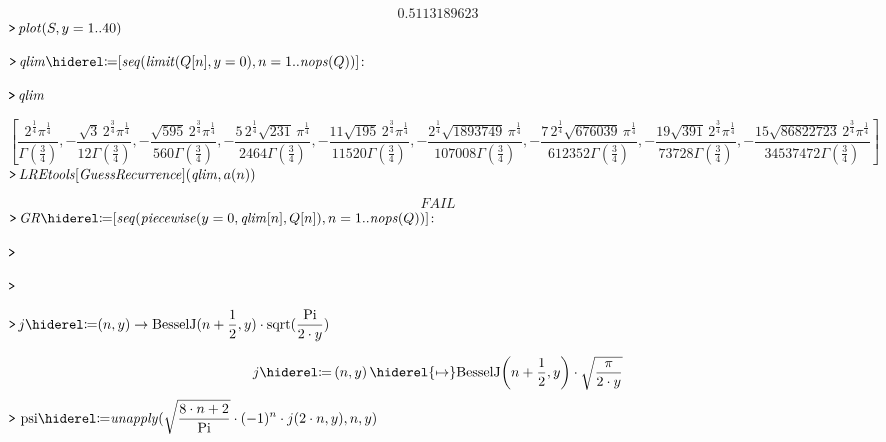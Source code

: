 \documentclass{article}
\begin{document}
\begin{dmath}\label{(37)}
 0.5113189623
\end{dmath}
\mapleinput
{$ \displaystyle \texttt{>\,} \mathit{plot} (S ,y =1..40) $}


\mapleinput
{$ \displaystyle \texttt{>\,} \mathit{qlim} \coloneqq [\mathit{seq} (\mathit{limit} (Q [n],y =0),n =1..\mathit{nops} (Q))]\colon  $}

\mapleinput
{$ \displaystyle \texttt{>\,} \mathit{qlim}  $}

\begin{dmath}\label{(38)}
\left[\frac{2^{\frac{1}{4}} \pi^{\frac{1}{4}}}{\Gamma \! \left(\frac{3}{4}\right)},-\frac{\sqrt{3}\, 2^{\frac{3}{4}} \pi^{\frac{1}{4}}}{12 \Gamma \! \left(\frac{3}{4}\right)},-\frac{\sqrt{595}\, 2^{\frac{3}{4}} \pi^{\frac{1}{4}}}{560 \Gamma \! \left(\frac{3}{4}\right)},-\frac{5 \,2^{\frac{1}{4}} \sqrt{231}\, \pi^{\frac{1}{4}}}{2464 \Gamma \! \left(\frac{3}{4}\right)},-\frac{11 \sqrt{195}\, 2^{\frac{3}{4}} \pi^{\frac{1}{4}}}{11520 \Gamma \! \left(\frac{3}{4}\right)},-\frac{2^{\frac{1}{4}} \sqrt{1893749}\, \pi^{\frac{1}{4}}}{107008 \Gamma \! \left(\frac{3}{4}\right)},-\frac{7 \,2^{\frac{1}{4}} \sqrt{676039}\, \pi^{\frac{1}{4}}}{612352 \Gamma \! \left(\frac{3}{4}\right)},-\frac{19 \sqrt{391}\, 2^{\frac{3}{4}} \pi^{\frac{1}{4}}}{73728 \Gamma \! \left(\frac{3}{4}\right)},-\frac{15 \sqrt{86822723}\, 2^{\frac{3}{4}} \pi^{\frac{1}{4}}}{34537472 \Gamma \! \left(\frac{3}{4}\right)}\right]
\end{dmath}
\mapleinput
{$ \displaystyle \texttt{>\,} \mathit{LREtools} [\mathit{GuessRecurrence}](\mathit{qlim} ,a (n)) $}

\begin{dmath}\label{(39)}
\mathit{FAIL} 
\end{dmath}
\mapleinput
{$ \displaystyle \texttt{>\,} \mathit{GR} \coloneqq [\mathit{seq} (\mathit{piecewise} (y =0,\mathit{qlim} [n],Q [n]),n =1..\mathit{nops} (Q))]\colon  $}

\mapleinput
{$ \displaystyle \texttt{>\,}  $}

\mapleinput
{$ \displaystyle \texttt{>\,}  $}

\mapleinput
{$ \displaystyle \texttt{>\,} j \coloneqq (n ,y)\rightarrow \mathrm{BesselJ}(n +\frac{1}{2},y)\cdot \mathrm{sqrt}(\frac{\mathrm{Pi}}{2\cdot y})\, $}

\begin{dmath}\label{(40)}
j \coloneqq \left(n ,y \right)\hiderel{\mapsto }\mathrm{BesselJ}\! \left(n +\frac{1}{2},y \right)\cdot \sqrt{\frac{\pi}{2\cdot y}}
\end{dmath}
\mapleinput
{$ \displaystyle \texttt{>\,} \,\mathrm{psi}\coloneqq \mathit{unapply} (\sqrt{\frac{8\cdot n +2}{\mathrm{Pi}}}\cdot (-1)^{n}\cdot j (2\cdot n ,y),n ,y) $}
\end{document}
